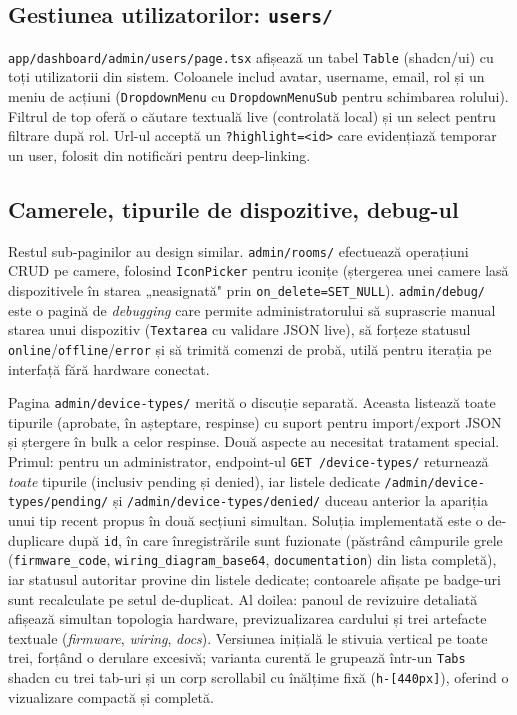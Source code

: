 \subsection{Gestiunea utilizatorilor: \texttt{users/}}
\texttt{app/dashboard/admin/users/page.tsx} afișează un tabel \texttt{Table} (shadcn/ui) cu toți utilizatorii din sistem. Coloanele includ avatar, username, email, rol și un meniu de acțiuni (\texttt{DropdownMenu} cu \texttt{DropdownMenuSub} pentru schimbarea rolului). Filtrul de top oferă o căutare textuală live (controlată local) și un select pentru filtrare după rol. Url-ul acceptă un \texttt{?highlight=<id>} care evidențiază temporar un user, folosit din notificări pentru deep-linking.

\subsection{Camerele, tipurile de dispozitive, debug-ul}
Restul sub-paginilor au design similar. \texttt{admin/rooms/} efectuează operațiuni CRUD pe camere, folosind \texttt{IconPicker} pentru iconițe (ștergerea unei camere lasă dispozitivele în starea „neasignată" prin \texttt{on\_delete=SET\_NULL}). \texttt{admin/debug/} este o pagină de \emph{debugging} care permite administratorului să suprascrie manual starea unui dispozitiv (\texttt{Textarea} cu validare JSON live), să forțeze statusul \texttt{online}/\texttt{offline}/\texttt{error} și să trimită comenzi de probă, utilă pentru iterația pe interfață fără hardware conectat.

Pagina \texttt{admin/device-types/} merită o discuție separată. Aceasta listează toate tipurile (aprobate, în așteptare, respinse) cu suport pentru import/export JSON și ștergere în bulk a celor respinse. Două aspecte au necesitat tratament special. Primul: pentru un administrator, endpoint-ul \texttt{GET /device-types/} returnează \emph{toate} tipurile (inclusiv pending și denied), iar listele dedicate \texttt{/admin/device-types/pending/} și \texttt{/admin/device-types/denied/} duceau anterior la apariția unui tip recent propus în două secțiuni simultan. Soluția implementată este o de-duplicare după \texttt{id}, în care înregistrările sunt fuzionate (păstrând câmpurile grele (\texttt{firmware\_code}, \texttt{wiring\_diagram\_base64}, \texttt{documentation}) din lista completă), iar statusul autoritar provine din listele dedicate; contoarele afișate pe badge-uri sunt recalculate pe setul de-duplicat. Al doilea: panoul de revizuire detaliată afișează simultan topologia hardware, previzualizarea cardului și trei artefacte textuale (\emph{firmware}, \emph{wiring}, \emph{docs}). Versiunea inițială le stivuia vertical pe toate trei, forțând o derulare excesivă; varianta curentă le grupează într-un \texttt{Tabs} shadcn cu trei tab-uri și un corp scrollabil cu înălțime fixă (\texttt{h-[440px]}), oferind o vizualizare compactă și completă.
